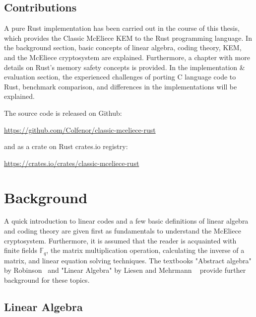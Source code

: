 \documentclass[11pt,
  oneside,openany,    %
]{scrreprt}
\begin{document}
\section{Contributions}
A pure Rust implementation has been carried out in the course of this thesis, which provides the Classic McEliece KEM to the Rust programming language. 
In the background section, basic concepts of linear algebra, coding theory, KEM, and the McEliece cryptosystem are explained. Furthermore, a chapter with more details on Rust's memory safety concepts is provided. In the implementation \& evaluation section, the experienced challenges of porting C language code to Rust, benchmark comparison, and differences in the implementations will be explained. 

The source code is released on Github:

\url{https://github.com/Colfenor/classic-mceliece-rust}

and as a crate on Rust crates.io registry:

\url{https://crates.io/crates/classic-mceliece-rust}


\chapter{Background}
\label{chap:background}

\newcommand\spacebetweenparandheader{\vspace{20pt}}

 A quick introduction to linear codes and a few basic definitions of linear algebra and coding theory are given first as fundamentals to understand the McEliece cryptosystem. Furthermore, it is assumed that the reader is acquainted with finite fields $\mathbb{F}_{q}$, the matrix multiplication operation, calculating the inverse of a matrix, and linear equation solving techniques. The textbooks "Abstract algebra" by Robinson~\cite{AbstractAlgebraRobinson} and "Linear Algebra" by Liesen and Mehrmann ~\cite{liesenlineareAlgebra} provide further background for these topics.\spacebetweenparandheader

\section{Linear Algebra}
\end{document}
